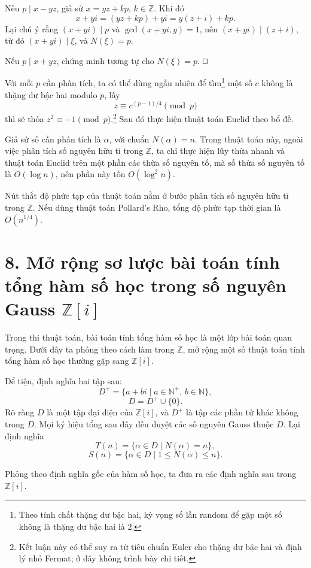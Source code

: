 \documentclass[11pt]{article}
\newcommand{\square}{\mathord{\vcenter{\hrule height .5pt
  \hbox{\vrule width .5pt height 5pt\kern5pt\vrule width .5pt}
  \hrule height .5pt}}}
\begin{document}
Nếu \(p\mid x-yz\), giả sử \(x=yz+kp\), \(k\in\mathbb Z\). Khi đó
\[
  x+yi=(yz+kp)+yi=y(z+i)+kp.
\]
Lại chú ý rằng \((x+yi)\mid p\) và \(\gcd(x+yi,y)=1\), nên
\((x+yi)\mid(z+i)\), từ đó \((x+yi)\mid\xi\), và \(N(\xi)=p\).

Nếu \(p\mid x+yz\), chứng minh tương tự cho \(N(\xi)=p\). \(\square\)

Với mỗi \(p\) cần phân tích, ta có thể dùng ngẫu nhiên để tìm\footnote{Theo
tính chất thặng dư bậc hai, kỳ vọng số lần random để gặp một số không là thặng
dư bậc hai là \(2\).} một số \(c\) không là thặng dư bậc hai modulo \(p\), lấy
\[
  z\equiv c^{(p-1)/4}\pmod p
\]
thì sẽ thỏa \(z^2\equiv-1\pmod p\).\footnote{Kết luận này có thể suy ra từ
tiêu chuẩn Euler cho thặng dư bậc hai và định lý nhỏ Fermat; ở đây không trình
bày chi tiết.} Sau đó thực hiện thuật toán Euclid theo bổ đề.

Giả sử số cần phân tích là \(\alpha\), với chuẩn \(N(\alpha)=n\). Trong thuật
toán này, ngoài việc phân tích số nguyên hữu tỉ trong \(\mathbb Z\), ta chỉ
thực hiện lũy thừa nhanh và thuật toán Euclid trên một phần các thừa số
nguyên tố, mà số thừa số nguyên tố là \(O(\log n)\), nên phần này tốn
\(O(\log^2 n)\).

Nút thắt độ phức tạp của thuật toán nằm ở bước phân tích số nguyên hữu tỉ
trong \(\mathbb Z\). Nếu dùng thuật toán Pollard's Rho, tổng độ phức tạp thời
gian là \(O(n^{1/4})\).

\section*{8. Mở rộng sơ lược bài toán tính tổng hàm số học trong số nguyên
Gauss \(\mathbb Z[i]\)}

Trong thi thuật toán, bài toán tính tổng hàm số học là một lớp bài toán quan
trọng. Dưới đây ta phỏng theo cách làm trong \(\mathbb Z\), mở rộng một số
thuật toán tính tổng hàm số học thường gặp sang \(\mathbb Z[i]\).

Để tiện, định nghĩa hai tập sau:
\[
  D^+=\{a+bi\mid a\in\mathbb N^+,\,b\in\mathbb N\},
\]
\[
  D=D^+\cup\{0\}.
\]
Rõ ràng \(D\) là một tập đại diện của \(\mathbb Z[i]\), và \(D^+\) là tập các
phần tử khác không trong \(D\). Mọi ký hiệu tổng sau đây đều duyệt các số
nguyên Gauss thuộc \(D\). Lại định nghĩa
\[
  T(n)=\{\alpha\in D\mid N(\alpha)=n\},
\]
\[
  S(n)=\{\alpha\in D\mid 1\le N(\alpha)\le n\}.
\]

Phỏng theo định nghĩa gốc của hàm số học, ta đưa ra các định nghĩa sau trong
\(\mathbb Z[i]\).
\end{document}
